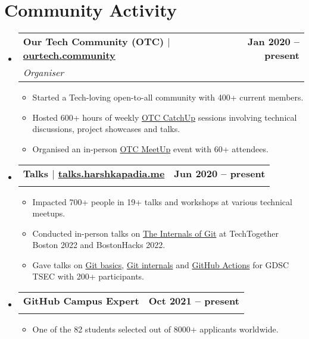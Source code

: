 \documentclass[letterpaper,11pt]{article}
\makeatletter
\newcommand{\resumeItem}[1]{
  \item\small{
    {#1 \vspace{-2pt}}
  }
}
\newcommand{\resumeSubheading}[4]{
  \vspace{-2pt}\item
    \begin{tabular*}{1.0\textwidth}[t]{l@{\extracolsep{\fill}}r}
      \vspace{-2pt}\textbf{#1} & \textbf{\small #2} \\
      \textit{\small#3} & \textit{\small #4} \\
    \end{tabular*}\vspace{-7pt}
}
\newcommand{\resumeSubHeadingListStart}{\begin{itemize}[leftmargin=0.0in, label={}]}
\newcommand{\resumeSubHeadingListEnd}{\end{itemize}}
\newcommand{\resumeItemListStart}{\begin{itemize}}
\newcommand{\resumeItemListEnd}{\end{itemize}\vspace{-5pt}}
\makeatother
\begin{document}
\section{Community Activity}
    \vspace{-2pt}
    \resumeSubHeadingListStart
        \resumeSubheading
            {\textbf{\normalsize{Our Tech Community (OTC)}} $|$ {\normalfont \href{https://ourtech.community}{ourtech.community}}}{Jan 2020 -- present}
            {Organiser}{}
            \vspace{-7pt}
            \resumeItemListStart
                \resumeItem{Started a Tech-loving open-to-all community with 400+ current members.}
                \resumeItem{Hosted 600+ hours of weekly \href{https://catchup.ourtech.community}{OTC CatchUp} sessions involving technical discussions, project showcases and talks.}
                \resumeItem{Organised an in-person \href{https://meetup.ourtech.community}{OTC MeetUp} event with 60+ attendees.}
            \resumeItemListEnd
        \vspace{-4pt}

        \resumeSubheading
            {\textbf{\normalsize{Talks}} $|$ {\normalfont \href{https://talks.harshkapadia.me}{talks.harshkapadia.me}}}{Jun 2020 -- present}
            {}{}
            \vspace{-18pt}
            \resumeItemListStart
                \resumeItem{Impacted 700+ people in 19+ talks and workshops at various technical meetups.}
                \resumeItem{Conducted in-person talks on \href{https://talks.harshkapadia.me/git_internals}{The Internals of Git} at TechTogether Boston 2022 and BostonHacks 2022.}
                \resumeItem{Gave talks on \href{https://gdsc.community.dev/events/details/developer-student-clubs-thadomal-shahani-engineering-college-mumbai-presents-git-and-github-workshop}{Git basics}, \href{https://gdsc.community.dev/events/details/developer-student-clubs-thadomal-shahani-engineering-college-mumbai-presents-git-internals-how-does-git-work}{Git internals} and \href{https://gdsc.community.dev/events/details/developer-student-clubs-thadomal-shahani-engineering-college-mumbai-presents-working-with-cicd-github-actions}{GitHub Actions} for GDSC TSEC with 200+ participants.}
            \resumeItemListEnd
        \vspace{-4pt}

        \resumeSubheading
            {\textbf{\normalsize{GitHub Campus Expert}}}{Oct 2021 -- present}
            {}{}
            \vspace{-18pt}
            \resumeItemListStart
                \resumeItem{One of the 82 students selected out of 8000+ applicants worldwide.}
            \resumeItemListEnd
    \resumeSubHeadingListEnd
\vspace{-19pt}
\end{document}
